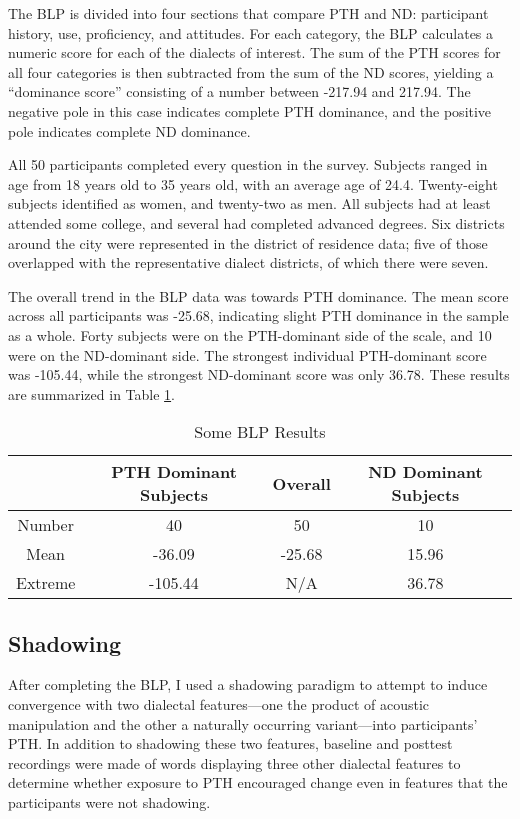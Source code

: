 The BLP is divided into four sections that compare PTH and ND: participant history, use, proficiency, and attitudes. For each category, the BLP calculates a numeric score for each of the dialects of interest. The sum of the PTH scores for all four categories is then subtracted from the sum of the ND scores, yielding a “dominance score” consisting of a number between -217.94 and 217.94. The negative pole in this case indicates complete PTH dominance, and the positive pole indicates complete ND dominance.

All 50 participants completed every question in the survey. Subjects ranged in age from 18 years old to 35 years old, with an average age of 24.4. Twenty-eight subjects identified as women, and twenty-two as men. All subjects had at least attended some college, and several had completed advanced degrees. Six districts around the city were represented in the district of residence data; five of those overlapped with the representative dialect districts, of which there were seven.

The overall trend in the BLP data was towards PTH dominance. The mean score across all participants was -25.68, indicating slight PTH dominance in the sample as a whole. Forty subjects were on the PTH-dominant side of the scale, and 10 were on the ND-dominant side. The strongest individual PTH-dominant score was -105.44, while the strongest ND-dominant score was only 36.78. These results are summarized in Table \ref{table:BLPResults}.

\begin{table}
\centering
\begin{tabular}{|c||c|c|c|}
 \hline
  & PTH Dominant Subjects & Overall & ND Dominant Subjects \\ [0.5ex] 
 \hline\hline
 Number & 40 & 50 & 10 \\ 
 \hline
 Mean & -36.09 & -25.68 & 15.96 \\
 \hline
 Extreme & -105.44 & N/A & 36.78 \\
 \hline
\end{tabular}
\caption{Some BLP Results}
\label{table:BLPResults}
\end{table}

\subsection{Shadowing}
\label{ssec:procedureShadowing}
After completing the BLP, I used a shadowing paradigm to attempt to induce convergence with two dialectal features---one the product of acoustic manipulation and the other a naturally occurring variant---into participants’ PTH. In addition to shadowing these two features, baseline and posttest recordings were made of words displaying three other dialectal features to determine whether exposure to PTH encouraged change even in features that the participants were not shadowing.

